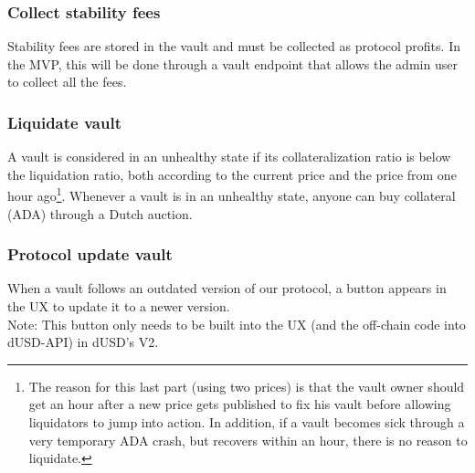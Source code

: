 \documentclass{article} %
\begin{document}
\subsubsection*{Collect stability fees}

Stability fees are stored in the vault and must be collected as protocol
profits. In the MVP, this will be done through a vault endpoint that allows the
admin user to collect all the fees. \\


\subsubsection*{Liquidate vault}

A vault is considered in an unhealthy state if its collateralization ratio is
below the liquidation ratio, both according to the current price and the price
from one hour ago\footnote{
  The reason for this last part (using two prices) is that the vault owner
  should get an hour after a new price gets published to fix his vault before
  allowing liquidators to jump into action. In addition, if a vault becomes sick
  through a very temporary ADA crash, but recovers within an hour, there is no
  reason to liquidate.}.
Whenever a vault is in an unhealthy state, anyone can buy collateral (ADA)
through a Dutch auction.

\subsubsection*{Protocol update vault}

When a vault follows an outdated version of our protocol, a button appears in
the UX to update it to a newer version. \\

Note: This button only needs to be built into the UX (and the off-chain code
into dUSD-API) in dUSD's V2.
\end{document}
